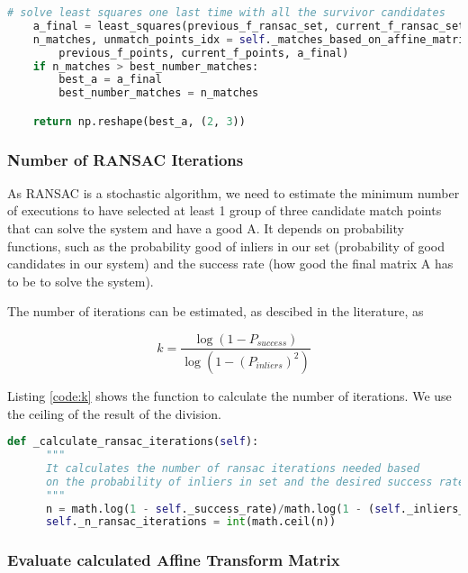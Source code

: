 \documentclass[]{IEEEtran}
\begin{document}
\begin{lstlisting}[language=Python, caption={RANSAC to estimate Affine Transformation Matrix}, label={code:ransac}]
    # solve least squares one last time with all the survivor candidates
    a_final = least_squares(previous_f_ransac_set, current_f_ransac_set)
    n_matches, unmatch_points_idx = self._matches_based_on_affine_matrix(
        previous_f_points, current_f_points, a_final)
    if n_matches > best_number_matches:
        best_a = a_final
        best_number_matches = n_matches

    return np.reshape(best_a, (2, 3))
\end{lstlisting}

\subsubsection{Number of RANSAC Iterations}
  As RANSAC is a stochastic algorithm, we need to estimate the minimum number of executions to have selected at least 1 group of three candidate match points that can solve the system and have a good A. It depends on probability functions, such as the probability good of inliers in our set (probability of good candidates in our system) and the success rate (how good the final matrix A has to be to solve the system). 

  The number of iterations can be estimated, as descibed in the literature, as

  \begin{equation}
    k = \dfrac{\log (1 - P_{success})}{\log (1 - (P_{inliers})^{2})}
  \end{equation}

  Listing \ref{code:k} shows the function to calculate the number of iterations. We use the ceiling of the result of the division.

  \begin{lstlisting}[language=Python, caption={Calculate number of RANSAC iterations}, label={code:k}]
    def _calculate_ransac_iterations(self):
      """
      It calculates the number of ransac iterations needed based
      on the probability of inliers in set and the desired success rate
      """
      n = math.log(1 - self._success_rate)/math.log(1 - (self._inliers_rate)**2)
      self._n_ransac_iterations = int(math.ceil(n))
  \end{lstlisting}

\subsubsection{Evaluate calculated Affine Transform Matrix}

\end{document}

